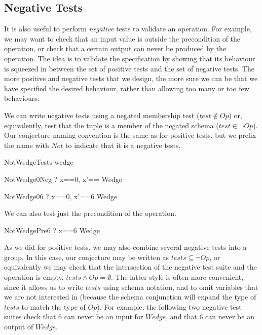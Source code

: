 \documentclass{llncs}
\begin{document}
\subsection{Negative Tests}

It is also useful to perform \emph{negative} tests to validate an
operation.  For example, we may want to check that an input value is
outside the precondition of the operation, or check that a certain output
can never be produced by the operation.  The idea is to validate the
specification by showing that its behaviour is squeezed in between the set
of positive tests and the set of negative tests.  The more positive and
negative tests that we design, the more sure we can be that we have
specified the desired behaviour, rather than allowing too many or too few
behaviours.

We can write negative tests using a negated membership test ($test \notin
Op$) or, equivalently, test that the tuple is a member of the negated
schema ($test \in \lnot Op$).
Our conjecture naming convention is the same as for positive tests, but
we prefix the name with $Not$ to indicate that it is a negative tests.

\begin{zsection}
  \SECTION NotWedgeTests \parents wedge
\end{zsection}

\begin{theorem}{NotWedge0Neg}
\vdash? \quad \lblot x==0, x'== \rblot \notin Wedge
\end{theorem}

\begin{theorem}{NotWedge06}
\vdash? \quad \lblot x==0, x'==6 \rblot \in \lnot Wedge
\end{theorem}

We can also test just the precondition of the operation.
\begin{theorem}{NotWedgePre6}
\vdash? \quad \lblot x==6 \rblot \notin \pre Wedge
\end{theorem}

As we did for positive tests, we may also combine several negative tests
into a group.  In this case, our conjecture may be written as $tests
\subseteq \lnot Op$, or equivalently we may check that the intersection of
the negative test suite and the operation is empty, $tests \land Op =
\emptyset$.  The latter style is often more convenient, since it allows us
to write $tests$ using schema notation, and to omit variables that we are
not interested in (because the schema conjunction will expand the type of
$tests$ to match the type of $Op$).  For example, the following two negative
test suites check that 6 can never be an input for $Wedge$, and that 6 can
never be an output of $Wedge$.
\end{document}
